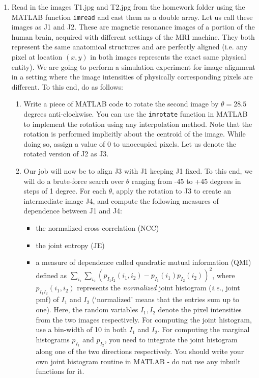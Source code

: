 \documentclass[11pt]{article}
\begin{document}
\begin{enumerate}
    \item Read in the images T1.jpg and T2.jpg from the homework folder using the MATLAB function \texttt{imread} and cast them as a double array. Let us call these images as J1 and J2. These are magnetic resonance images of a portion of the human brain, acquired with different settings of the MRI machine. They both represent the same anatomical structures and are perfectly aligned (i.e. any pixel at location $(x,y)$ in both images represents the exact same physical entity). We are going to perform a simulation experiment for image alignment in a setting where the image intensities of physically corresponding pixels are different. To this end, do as follows:
          \begin{enumerate}
              \item Write a piece of MATLAB code to rotate the second image by $\theta = 28.5$ degrees anti-clockwise. You can use the \texttt{imrotate} function in MATLAB to implement the rotation using any interpolation method. Note that the rotation is performed implicitly about the centroid of the image. While doing so, assign a value of 0 to unoccupied pixels. Let us denote the rotated version of J2 as J3.
              \item Our job will now be to align J3 with J1 keeping J1 fixed. To this end, we will do a brute-force search over $\theta$ ranging from -45 to +45 degrees in steps of 1 degree. For each $\theta$, apply the rotation to J3 to create an intermediate image J4, and compute the following measures of dependence between J1 and J4:
                    \begin{itemize}
                        \item the normalized cross-correlation (NCC)
                        \item the joint entropy (JE)
                        \item a measure of dependence called quadratic mutual information (QMI) defined as $\sum_{i_1}\sum_{i_2} (p_{I_1 I_2}(i_1,i_2)-p_{I_1}(i_1)p_{I_2}(i_2))^2$, where $p_{I_1 I_2}(i_1,i_2)$ represents the \emph{normalized} joint histogram (\textit{i.e.}, joint pmf) of $I_1$ and $I_2$ (`normalized' means that the entries sum up to one). Here, the random variables $I_1, I_2$ denote the pixel intensities from the two images respectively. For computing the joint histogram, use a bin-width of 10 in both $I_1$ and $I_2$. For computing the marginal histograms $p_{I_1}$ and $p_{I_2}$, you need to integrate the joint histogram along one of the two directions respectively. You should write your own joint histogram routine in MATLAB - do not use any inbuilt functions for it.

\end{itemize}
\end{enumerate}
\end{enumerate}
\end{document}
